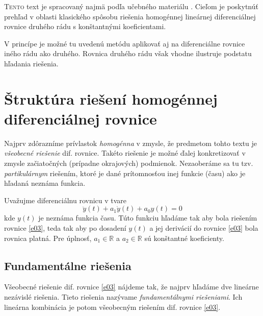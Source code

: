 \documentclass[a4paper, 10pt, ]{article}
\begin{document}
\bigskip

\normalsize
\normalfont












\noindent
\lettrine[lines=1, nindent=1pt, loversize=0.0]{T}{ento} 
text je spracovaný najmä podľa učebného materiálu \cite{Mihalikova2012}. Cieľom je poskytnúť prehľad v oblasti klasického spôsobu riešenia homogénnej lineárnej diferenciálnej rovnice druhého rádu s konštantnými koeficientami.

V princípe je možné tu uvedenú metódu aplikovať aj na diferenciálne rovnice iného rádu ako druhého. Rovnica druhého rádu však vhodne ilustruje podstatu hľadania riešenia.


\section{Štruktúra riešení homogénnej diferenciálnej rovnice}

Najprv zdôrazníme prívlastok \emph{homogénna} v zmysle, že predmetom tohto textu je \emph{všeobecné riešenie} dif. rovnice. Takéto riešenie je možné ďalej konkretizovať v zmysle začiatočných (prípadne okrajových) podmienok. Nezaoberáme sa tu tzv. \emph{partikulárnym} riešením, ktoré je dané prítomnosťou inej funkcie (času) ako je hľadaná neznáma funkcia.

Uvažujme diferenciálnu rovnicu v tvare
\begin{equation}
    \ddot y(t) + a_1 \dot y(t) + a_0 y(t) = 0 \label{e03}
\end{equation}
kde $y(t)$ je neznáma funkcia času. Túto funkciu hľadáme tak aby bola riešením rovnice \eqref{e03}, teda tak aby po dosadení $y(t)$ a jej derivácií do rovnice \eqref{e03} bola rovnica platná. Pre úplnosť, $a_1 \in \mathbb R$ a $a_2  \in \mathbb R$ sú konštantné koeficienty.

\subsection{Fundamentálne riešenia}

Všeobecné riešenie dif. rovnice \eqref{e03} nájdeme tak, že najprv hľadáme dve lineárne nezávislé riešenia. Tieto riešenia nazývame \emph{fundamentálnymi riešeniami}. Ich lineárna kombinácia je potom všeobecným riešením dif. rovnice \eqref{e03}.
\end{document}
